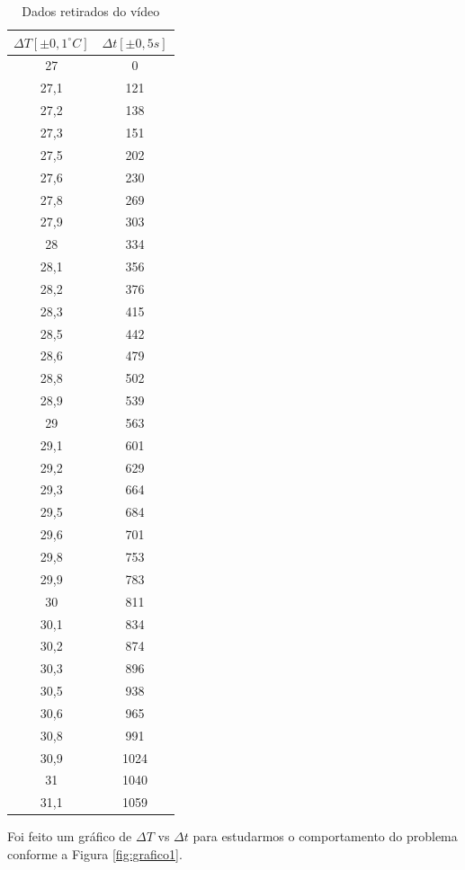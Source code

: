 \begin{table}[htbp!]
    \centering
    \begin{tabular}{c|c}
    \hline
    $\Delta T [\pm0,1^{\circ}C]$ & $\Delta t[\pm 0,5s]$\\
    \hline
       27   & 0    \\
27,1 & 121  \\
27,2 & 138  \\
27,3 & 151  \\
27,5 & 202  \\
27,6 & 230  \\
27,8 & 269  \\
27,9 & 303  \\
28   & 334  \\
28,1 & 356  \\
28,2 & 376  \\
28,3 & 415  \\
28,5 & 442  \\
28,6 & 479  \\
28,8 & 502  \\
28,9 & 539  \\
29   & 563  \\
29,1 & 601  \\
29,2 & 629  \\
29,3 & 664  \\
29,5 & 684  \\
29,6 & 701  \\
29,8 & 753  \\
29,9 & 783  \\
30   & 811  \\
30,1 & 834  \\
30,2 & 874  \\
30,3 & 896  \\
30,5 & 938  \\
30,6 & 965  \\
30,8 & 991  \\
30,9 & 1024 \\
31   & 1040 \\
31,1 & 1059 \\
\hline
    \end{tabular}
    \caption{Dados retirados do vídeo}
    \label{tab:dados}
\end{table}

Foi feito um gráfico de $\Delta T$ vs $\Delta t$ para estudarmos o comportamento do problema conforme a Figura \ref{fig:grafico1}.

